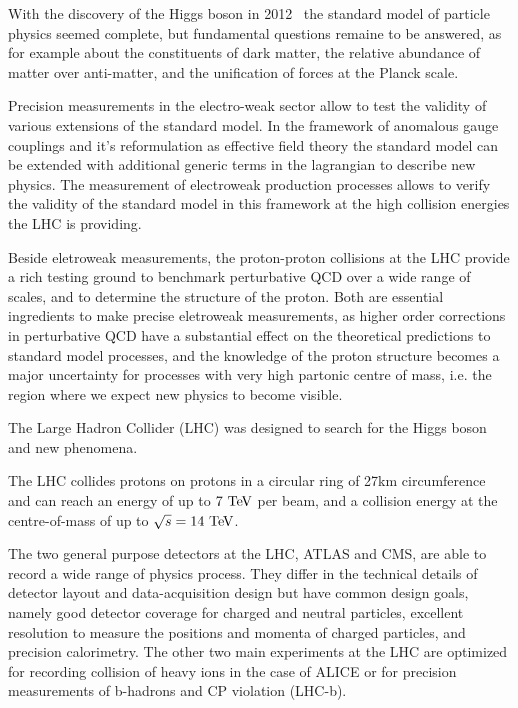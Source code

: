 \label{ss-intro-motivation}

With the discovery of the Higgs boson in 2012~\cite{Chatrchyan201230, Aad20121} 
the standard model of particle physics
seemed complete, but fundamental questions remaine to be answered, as for example about the
constituents of dark matter, the relative abundance of matter over anti-matter, 
and the unification of forces at the Planck scale. 

Precision measurements in the electro-weak sector allow to test the validity of 
various extensions of the standard model. In the framework of anomalous gauge couplings
and it's reformulation as effective field theory the standard model can be extended
with additional generic terms in the lagrangian to describe new physics. The 
measurement of electroweak production processes allows to verify the validity 
of the standard model in this framework at the high collision energies the LHC
is providing.

Beside eletroweak measurements, the proton-proton collisions at the LHC provide a rich testing ground to 
benchmark perturbative QCD over a wide range of scales, and to determine the structure
of the proton. Both are essential ingredients to make precise eletroweak measurements, as higher order
corrections in perturbative QCD have a substantial effect on the theoretical predictions to 
standard model processes, and the knowledge of the proton structure becomes a major uncertainty
for processes with very high partonic centre of mass, i.e. the region where we expect new physics
to become visible.

The Large Hadron Collider (LHC) was designed to search for the Higgs boson and
new phenomena. 

The LHC collides protons on protons in a circular ring of 27\;km 
circumference and can reach an energy of up to $7\TeV$ per beam, and a collision
energy at the centre-of-mass of up to $\rts=14\TeV$. 

The two general purpose detectors at the LHC, ATLAS and CMS, are able to
record a wide range of physics process. They differ in the technical details of detector
layout and data-acquisition design but have common design goals, namely 
good detector coverage for charged and neutral particles, excellent resolution to measure
the positions and momenta of charged particles, and precision calorimetry. The other two
main experiments at the LHC are optimized for recording collision of heavy ions in the 
case of ALICE or for precision measurements of b-hadrons and CP violation (LHC-b).

